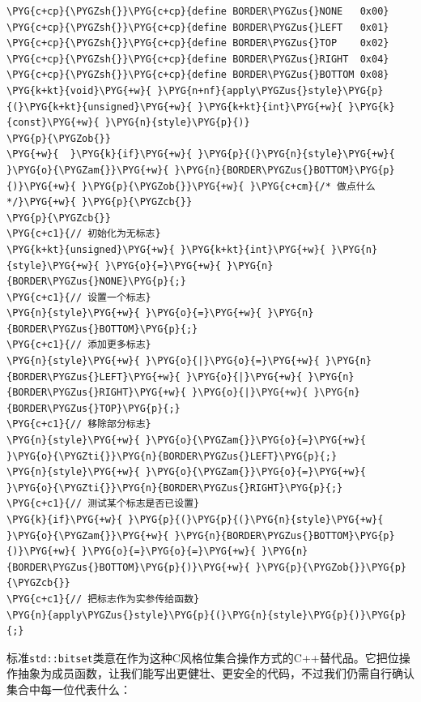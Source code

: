 \begin{codeblockbg}
\begin{Verbatim}[commandchars=\\\{\},breaklines=true,breakanywhere=true,fontsize=\codefont,xleftmargin=17bp]
\PYG{c+cp}{\PYGZsh{}}\PYG{c+cp}{define BORDER\PYGZus{}NONE   0x00}
\PYG{c+cp}{\PYGZsh{}}\PYG{c+cp}{define BORDER\PYGZus{}LEFT   0x01}
\PYG{c+cp}{\PYGZsh{}}\PYG{c+cp}{define BORDER\PYGZus{}TOP    0x02}
\PYG{c+cp}{\PYGZsh{}}\PYG{c+cp}{define BORDER\PYGZus{}RIGHT  0x04}
\PYG{c+cp}{\PYGZsh{}}\PYG{c+cp}{define BORDER\PYGZus{}BOTTOM 0x08}
\PYG{k+kt}{void}\PYG{+w}{ }\PYG{n+nf}{apply\PYGZus{}style}\PYG{p}{(}\PYG{k+kt}{unsigned}\PYG{+w}{ }\PYG{k+kt}{int}\PYG{+w}{ }\PYG{k}{const}\PYG{+w}{ }\PYG{n}{style}\PYG{p}{)}
\PYG{p}{\PYGZob{}}
\PYG{+w}{  }\PYG{k}{if}\PYG{+w}{ }\PYG{p}{(}\PYG{n}{style}\PYG{+w}{ }\PYG{o}{\PYGZam{}}\PYG{+w}{ }\PYG{n}{BORDER\PYGZus{}BOTTOM}\PYG{p}{)}\PYG{+w}{ }\PYG{p}{\PYGZob{}}\PYG{+w}{ }\PYG{c+cm}{/* 做点什么 */}\PYG{+w}{ }\PYG{p}{\PYGZcb{}}
\PYG{p}{\PYGZcb{}}
\PYG{c+c1}{// 初始化为无标志}
\PYG{k+kt}{unsigned}\PYG{+w}{ }\PYG{k+kt}{int}\PYG{+w}{ }\PYG{n}{style}\PYG{+w}{ }\PYG{o}{=}\PYG{+w}{ }\PYG{n}{BORDER\PYGZus{}NONE}\PYG{p}{;}
\PYG{c+c1}{// 设置一个标志}
\PYG{n}{style}\PYG{+w}{ }\PYG{o}{=}\PYG{+w}{ }\PYG{n}{BORDER\PYGZus{}BOTTOM}\PYG{p}{;}
\PYG{c+c1}{// 添加更多标志}
\PYG{n}{style}\PYG{+w}{ }\PYG{o}{|}\PYG{o}{=}\PYG{+w}{ }\PYG{n}{BORDER\PYGZus{}LEFT}\PYG{+w}{ }\PYG{o}{|}\PYG{+w}{ }\PYG{n}{BORDER\PYGZus{}RIGHT}\PYG{+w}{ }\PYG{o}{|}\PYG{+w}{ }\PYG{n}{BORDER\PYGZus{}TOP}\PYG{p}{;}
\PYG{c+c1}{// 移除部分标志}
\PYG{n}{style}\PYG{+w}{ }\PYG{o}{\PYGZam{}}\PYG{o}{=}\PYG{+w}{ }\PYG{o}{\PYGZti{}}\PYG{n}{BORDER\PYGZus{}LEFT}\PYG{p}{;}
\PYG{n}{style}\PYG{+w}{ }\PYG{o}{\PYGZam{}}\PYG{o}{=}\PYG{+w}{ }\PYG{o}{\PYGZti{}}\PYG{n}{BORDER\PYGZus{}RIGHT}\PYG{p}{;}
\PYG{c+c1}{// 测试某个标志是否已设置}
\PYG{k}{if}\PYG{+w}{ }\PYG{p}{(}\PYG{p}{(}\PYG{n}{style}\PYG{+w}{ }\PYG{o}{\PYGZam{}}\PYG{+w}{ }\PYG{n}{BORDER\PYGZus{}BOTTOM}\PYG{p}{)}\PYG{+w}{ }\PYG{o}{=}\PYG{o}{=}\PYG{+w}{ }\PYG{n}{BORDER\PYGZus{}BOTTOM}\PYG{p}{)}\PYG{+w}{ }\PYG{p}{\PYGZob{}}\PYG{p}{\PYGZcb{}}
\PYG{c+c1}{// 把标志作为实参传给函数}
\PYG{n}{apply\PYGZus{}style}\PYG{p}{(}\PYG{n}{style}\PYG{p}{)}\PYG{p}{;}
\end{Verbatim}
\end{codeblockbg}



标准\texttt{std::\allowbreak{}bitset}类意在作为这种C风格位集合操作方式的C++替代品。它把位操作抽象为成员函数，让我们能写出更健壮、更安全的代码，不过我们仍需自行确认集合中每一位代表什么：


